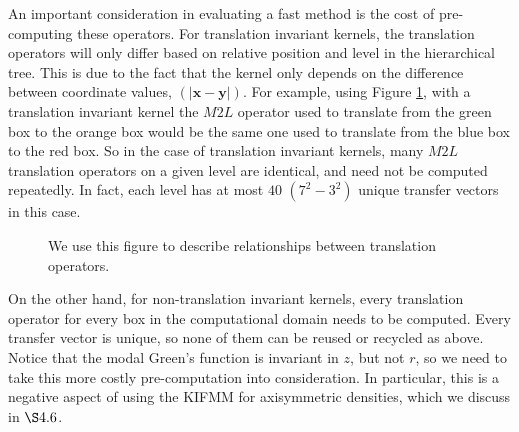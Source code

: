 \documentclass[11pt, oneside]{article}   	%
\begin{document}
An important consideration in evaluating a fast method is the cost of pre-computing these operators. For translation invariant kernels, the translation operators will only differ based on relative position and level in the hierarchical tree. This is due to the fact that the kernel only depends on the difference between coordinate values, $(|\mathbf{x}-\mathbf{y}|)$. For example, using Figure \ref{fig:7}, with a translation invariant kernel the $M2L$ operator used to translate from the green box to the orange box would be the same one used to translate from the blue box to the red box. So in the case of translation invariant kernels, many $M2L$ translation operators on a given level are identical, and need not be computed repeatedly. In fact, each level has at most $40$ $(7^2-3^2)$ unique transfer vectors in this case.

\begin{figure}[h]
\caption{We use this figure to describe relationships between translation operators.}
\label{fig:7}
\centering
\end{figure}

On the other hand, for non-translation invariant kernels, every translation operator for every box in the computational domain needs to be computed. Every transfer vector is unique, so none of them can be reused or recycled as above. Notice that the modal Green's function is invariant in $z$, but not $r$, so we need to take this more costly pre-computation into consideration. In particular, this is a negative aspect of using the KIFMM for axisymmetric densities, which we discuss in $\S4.6$.
\end{document}
